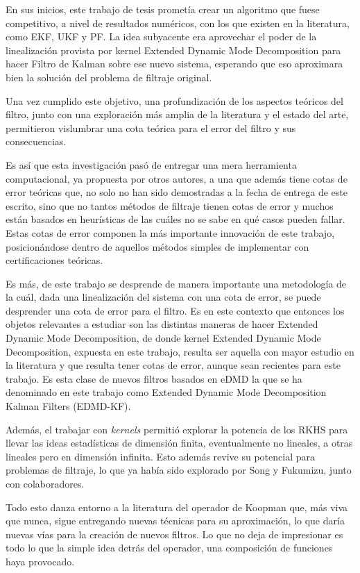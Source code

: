 En sus inicios, este trabajo de tesis prometía crear un algoritmo que fuese competitivo, a nivel de resultados numéricos, con los que existen en la literatura, como EKF, UKF y PF. La idea subyacente era aprovechar el poder de la linealización provista por kernel Extended Dynamic Mode Decomposition para hacer Filtro de Kalman sobre ese nuevo sistema, esperando que eso aproximara bien la solución del problema de filtraje original.

Una vez cumplido este objetivo, una profundización de los aspectos teóricos del filtro, junto con una exploración más amplia de la literatura y el estado del arte, permitieron vislumbrar una cota teórica para el error del filtro y sus consecuencias.

Es así que esta investigación pasó de entregar una mera herramienta computacional, ya propuesta por otros autores, a una que además tiene cotas de error teóricas que, no solo no han sido demostradas a la fecha de entrega de este escrito, sino que no tantos métodos de filtraje tienen cotas de error y muchos están basados en heurísticas de las cuáles no se sabe en qué casos pueden fallar. Estas cotas de error componen la más importante innovación de este trabajo, posicionándose dentro de aquellos métodos simples de implementar con certificaciones teóricas.

Es más, de este trabajo se desprende de manera importante una metodología de la cuál, dada una linealización del sistema con una cota de error, se puede desprender una cota de error para el filtro. Es en este contexto que entonces los objetos relevantes a estudiar son las distintas maneras de hacer Extended Dynamic Mode Decomposition, de donde kernel Extended Dynamic Mode Decomposition, expuesta en este trabajo, resulta ser aquella con mayor estudio en la literatura y que resulta tener cotas de error, aunque sean recientes para este trabajo. Es esta clase de nuevos filtros basados en eDMD la que se ha denominado en este trabajo como Extended Dynamic Mode Decomposition Kalman Filters (EDMD-KF).

Además, el trabajar con \textit{kernels} permitió explorar la potencia de los RKHS para llevar las ideas estadísticas de dimensión finita, eventualmente no lineales, a otras lineales pero en dimensión infinita. Esto además revive su potencial para problemas de filtraje, lo que ya había sido explorado por Song y Fukumizu, junto con colaboradores.

Todo esto danza entorno a la literatura del operador de Koopman que, más viva que nunca, sigue entregando nuevas técnicas para su aproximación, lo que daría nuevas vías para la creación de nuevos filtros. Lo que no deja de impresionar es todo lo que la simple idea detrás del operador, una composición de funciones haya provocado.

